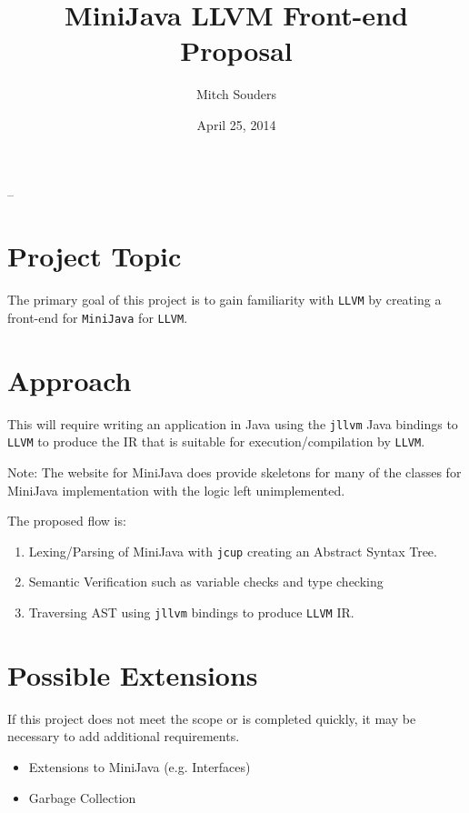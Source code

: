 \documentclass[11pt]{article}
\title{MiniJava LLVM Front-end Proposal}
\author{Mitch Souders}
\date{April 25, 2014}
\begin{document}
\makeatletter
\def\maketitle{\par{\centerline{\huge\bfseries\@title}}\par\@author -- \@date}
\makeatother

\maketitle

\section*{Project Topic}
The primary goal of this project is to gain familiarity with \texttt{LLVM} by creating a front-end for \texttt{MiniJava} for \texttt{LLVM}. 

\section*{Approach}
This will require writing an application in Java using the \texttt{jllvm} Java bindings to \texttt{LLVM} to produce the IR that is suitable for execution/compilation by \texttt{LLVM}. 

Note: The website for MiniJava does provide skeletons for many of the classes for MiniJava implementation with the logic left unimplemented.

The proposed flow is:
\begin{enumerate}
\item Lexing/Parsing of MiniJava with \texttt{jcup} creating an Abstract Syntax Tree.
\item Semantic Verification such as variable checks and type checking
\item Traversing AST using \texttt{jllvm} bindings to produce \texttt{LLVM} IR.
\end{enumerate}

\section*{Possible Extensions}
If this project does not meet the scope or is completed quickly, it may be necessary to add additional requirements. 

\begin{itemize}
\item Extensions to MiniJava (e.g. Interfaces)
\item Garbage Collection
\end{itemize}
\end{document}
